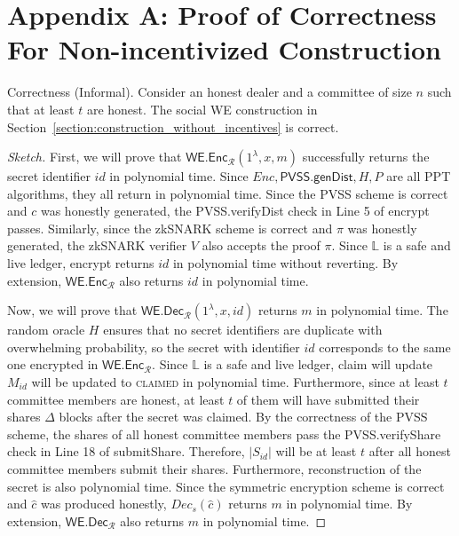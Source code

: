 \section{Appendix A: Proof of Correctness For Non-incentivized Construction}
\begin{theorem}{Correctness (Informal).}\label{thm:correctness_hm_appendix}
    Consider an honest dealer and a committee of size $n$ such that at least $t$ are honest.
    The social WE construction in Section~\ref{section:construction_without_incentives} is correct.
\end{theorem}
\begin{proof}[Sketch]
    First, we will prove that $\textsf{WE.Enc}_\mathcal{R}(1^{\lambda}, x, m)$ successfully returns the secret identifier $id$ in polynomial time.
    Since $Enc, \textsf{PVSS.genDist}, H, P$ are all PPT algorithms, they all return in polynomial time.
    Since the PVSS scheme is correct and $c$ was honestly generated, the \textsf{PVSS.verifyDist} check in Line 5 of \textsf{encrypt} passes.
    Similarly, since the zkSNARK scheme is correct and $\pi$ was honestly generated, the zkSNARK verifier $V$ also accepts the proof $\pi$.
    Since $\mathbb{L}$ is a safe and live ledger, \textsf{encrypt} returns $id$ in polynomial time without reverting.
    By extension, $\textsf{WE.Enc}_\mathcal{R}$ also returns $id$ in polynomial time.

    Now, we will prove that $\textsf{WE.Dec}_\mathcal{R}(1^{\lambda}, x, id)$ returns $m$ in polynomial time.
    The random oracle $H$ ensures that no secret identifiers are duplicate with overwhelming probability, so the secret with identifier $id$ corresponds to the same one encrypted in $\textsf{WE.Enc}_\mathcal{R}$.
    Since $\mathbb{L}$ is a safe and live ledger, \textsf{claim} will update $M_{id}$ will be updated to \textsc{claimed} in polynomial time.
    Furthermore, since at least $t$ committee members are honest, at least $t$ of them will have submitted their shares $\Delta$ blocks after the secret was claimed.
    By the correctness of the PVSS scheme, the shares of all honest committee members pass the \textsf{PVSS.verifyShare} check in Line 18 of \textsf{submitShare}.
    Therefore, $|S_{id}|$ will be at least $t$ after all honest committee members submit their shares.
    Furthermore, reconstruction of the secret is also polynomial time.
    Since the symmetric encryption scheme is correct and $\hat{c}$ was produced honestly, $Dec_s(\hat{c})$ returns $m$ in polynomial time.
    By extension, $\textsf{WE.Dec}_\mathcal{R}$ also returns $m$ in polynomial time.
\end{proof}
